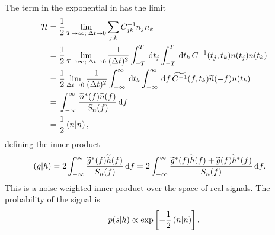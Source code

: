 The term in the exponential in  has the limit
\begin{align}
\mathcal{H} = {} & \frac{1}{2}\lim_{T \rightarrow \infty; \; \Delta t \rightarrow 0} \sum_{j,k}C^{-1}_{jk}n_j n_k \nonumber \\
 = {} & \frac{1}{2}\lim_{T \rightarrow \infty; \; \Delta t \rightarrow 0} \frac{1}{(\Delta t)^2}\int_{-T}^{T}\,\mathrm{d} t_j \int_{-T}^{T}\,\mathrm{d} t_k \, C^{-1}(t_j,t_k) n(t_j)n(t_k) \nonumber \\
 = {} & \frac{1}{2}\lim_{\Delta t \rightarrow 0} \frac{1}{(\Delta t)^2} \int_{-\infty}^{\infty}\,\mathrm{d} t_k \int_{-\infty}^{\infty}\,\mathrm{d} f \, \widetilde{C^{-1}}(f,t_k)\widetilde{n}(-f)n(t_k) \nonumber \\
 = {} & \int_{-\infty}^{\infty}{\frac{\widetilde{n}^\ast(f)\widetilde{n}(f)}{S_n(f)}}\,\mathrm{d}{f} \nonumber \\
 = {} & \frac{1}{2}\left({n}\middle|{n}\right),
 \end{align}
defining the inner product
\begin{align}
\left({g}\middle|{h}\right) = {} & 2\int_{-\infty}^{\infty}{\frac{\widetilde{g}^\ast(f)\widetilde{h}(f)}{S_n(f)}}\,\mathrm{d}{f} = 2 \int_{-\infty}^{\infty}{\frac{\widetilde{g}^\ast(f)\widetilde{h}(f) + \widetilde{g}(f)\widetilde{h}^\ast(f)}{S_n(f)}}\,\mathrm{d}{f}.
\end{align}
This is a noise-weighted inner product over the space of real signals. The probability of the signal is
\begin{equation}
p(s|h) \propto \exp\left[-\frac{1}{2}\left({n}\middle|{n}\right)\right].
\end{equation}


